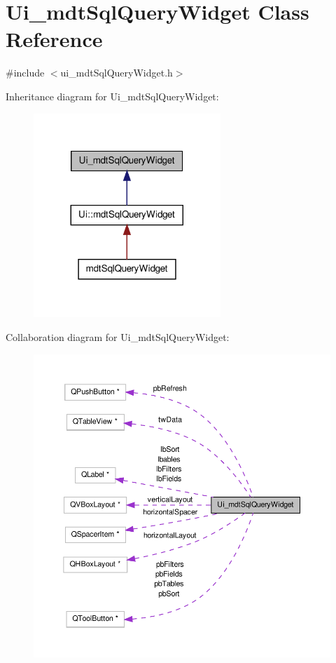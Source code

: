 \hypertarget{class_ui__mdt_sql_query_widget}{\section{Ui\-\_\-mdt\-Sql\-Query\-Widget Class Reference}
\label{class_ui__mdt_sql_query_widget}
}


{\ttfamily \#include $<$ui\-\_\-mdt\-Sql\-Query\-Widget.\-h$>$}



Inheritance diagram for Ui\-\_\-mdt\-Sql\-Query\-Widget\-:
\nopagebreak
\begin{figure}[H]
\begin{center}
\leavevmode
\includegraphics[width=200pt]{class_ui__mdt_sql_query_widget__inherit__graph}
\end{center}
\end{figure}


Collaboration diagram for Ui\-\_\-mdt\-Sql\-Query\-Widget\-:
\nopagebreak
\begin{figure}[H]
\begin{center}
\leavevmode
\includegraphics[width=350pt]{class_ui__mdt_sql_query_widget__coll__graph}
\end{center}
\end{figure}
